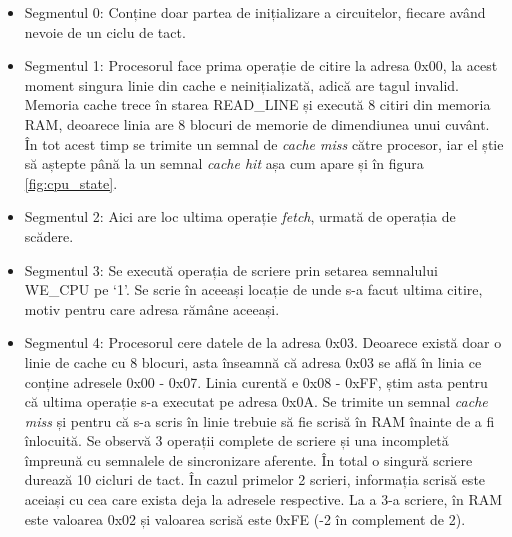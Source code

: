 \documentclass[../main.tex]{subfiles}
\begin{document}
\begin{itemize}
    \item Segmentul 0: Conține doar partea de inițializare a circuitelor, fiecare având nevoie de un ciclu de tact.
    \item Segmentul 1: Procesorul face prima operație de citire la adresa 0x00, la acest moment singura linie din cache e
    neinițializată, adică are tagul invalid. Memoria cache trece în starea READ\_LINE și execută 8 citiri din memoria RAM,
    deoarece linia are 8 blocuri de memorie de dimendiunea unui cuvânt. În tot acest timp se trimite un semnal de
    \emph{cache miss} către procesor, iar el știe să aștepte până la un semnal \emph{cache hit} așa cum apare și în figura
    \ref{fig:cpu_state}.
    \item Segmentul 2: Aici are loc ultima operație \emph{fetch}, urmată de operația de scădere.
    \item Segmentul 3: Se execută operația de scriere prin setarea semnalului WE\_CPU pe `1'. Se scrie în aceeași
    locație de unde s-a facut ultima citire, motiv pentru care adresa rămâne aceeași.
    \item Segmentul 4: Procesorul cere datele de la adresa 0x03. Deoarece există doar o linie de cache cu 8 blocuri, asta
    înseamnă că adresa 0x03 se află în linia ce conține adresele 0x00 - 0x07. Linia curentă e 0x08 - 0xFF, știm asta pentru
    că ultima operație s-a executat pe adresa 0x0A. Se trimite un semnal \emph{cache miss} și pentru că s-a scris în
    linie trebuie să fie scrisă în RAM înainte de a fi înlocuită. Se observă 3 operații complete de scriere și una incompletă
    împreună cu semnalele de sincronizare aferente. În total o singură scriere durează 10 cicluri de tact. În cazul primelor
    2 scrieri, informația scrisă este aceiași cu cea care exista deja la adresele respective. La a 3-a scriere, în RAM este
    valoarea 0x02 și valoarea scrisă este 0xFE (-2 în complement de 2).
\end{itemize}
\end{document}
